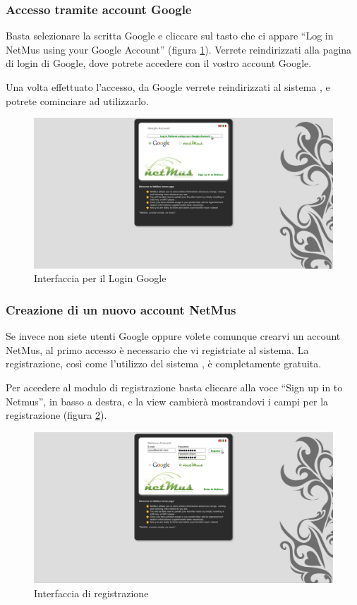 \subsubsection*{Accesso tramite account Google}
Basta selezionare la scritta Google e cliccare sul tasto che ci appare ``Log in
NetMus using your Google Account'' (figura \ref{fig:loginGoogle}). Verrete
reindirizzati alla pagina di login di Google, dove potrete accedere con il
vostro account Google.

Una volta effettuato l'accesso, da Google verrete reindirizzati al sistema
, e potrete cominciare ad utilizzarlo.
\begin{figure}[!htbp]
  \centering
  \includegraphics[width=14cm]{img/MU/loginGoogle.png}
\caption{Interfaccia per il Login Google}
\label{fig:loginGoogle}
\end{figure}

\subsubsection*{Creazione di un nuovo account NetMus}
Se invece non siete utenti Google oppure volete comunque crearvi un account
NetMus, al primo accesso \`e necessario che vi registriate al
sistema. La registrazione, cos\`i come l'utilizzo del sistema ,
\`e completamente gratuita.

Per accedere al modulo di registrazione basta cliccare alla voce ``Sign up in to
Netmus'', in basso a destra, e la view cambier\`a mostrandovi i campi per la
registrazione (figura \ref{fig:registrazione}).

\begin{figure}[!htbp]
  \centering
  \includegraphics[width=14cm]{img/MU/registration.png}
\caption{Interfaccia di registrazione}
\label{fig:registrazione}
\end{figure}

